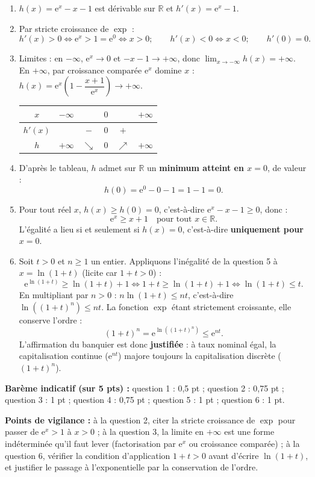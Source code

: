 \documentclass[11pt]{article}
\newcommand{\cle}[1]{{\popxbold\color{popdark}#1}}
\begin{document}
\begin{corrige}
\begin{enumerate}
\item $h(x)=\mathrm{e}^{x}-x-1$ est dérivable sur $\mathbb{R}$ et $h'(x)=\mathrm{e}^{x}-1$.
\item Par stricte croissance de $\exp$ :
\[h'(x)>0\iff \mathrm{e}^{x}>1=\mathrm{e}^{0}\iff x>0 ;\qquad h'(x)<0\iff x<0 ;\qquad h'(0)=0.\]
\item Limites : en $-\infty$, $\mathrm{e}^{x}\to 0$ et $-x-1\to +\infty$, donc $\displaystyle\lim_{x\to -\infty}h(x)=+\infty$.
En $+\infty$, par croissance comparée $\mathrm{e}^{x}$ domine $x$ : $h(x)=\mathrm{e}^{x}\left(1-\dfrac{x+1}{\mathrm{e}^{x}}\right)\to +\infty$.
\begin{center}
\begin{tabular}{|c|ccccc|}
\hline $x$ & $-\infty$ & & $0$ & & $+\infty$ \\ \hline $h'(x)$ & & $-$ & $0$ & $+$ & \\ \hline $h$ & $+\infty$ & $\searrow$ & $0$ & $\nearrow$ & $+\infty$ \\ \hline
\end{tabular}
\end{center}
\item D'après le tableau, $h$ admet sur $\mathbb{R}$ un \textbf{minimum atteint en $x=0$}, de valeur :
\[h(0)=\mathrm{e}^{0}-0-1=1-1=0.\]
\item Pour tout réel $x$, $h(x)\geq h(0)=0$, c'est-à-dire $\mathrm{e}^{x}-x-1\geq 0$, donc :
\[\boxed{\mathrm{e}^{x}\geq x+1\quad\text{pour tout }x\in\mathbb{R}.}\]
L'égalité a lieu si et seulement si $h(x)=0$, c'est-à-dire \textbf{uniquement pour $x=0$}.
\item Soit $t>0$ et $n\geq 1$ un entier. Appliquons l'inégalité de la question 5 à $x=\ln(1+t)$ (licite car $1+t>0$) :
\[\mathrm{e}^{\ln(1+t)}\geq \ln(1+t)+1\iff 1+t\geq \ln(1+t)+1\iff \ln(1+t)\leq t.\]
En multipliant par $n>0$ : $n\ln(1+t)\leq nt$, c'est-à-dire $\ln\!\left((1+t)^{n}\right)\leq nt$.
La fonction $\exp$ étant strictement croissante, elle conserve l'ordre :
\[(1+t)^{n}=\mathrm{e}^{\ln((1+t)^{n})}\leq \mathrm{e}^{nt}.\]
L'affirmation du banquier est donc \textbf{justifiée} : à taux nominal égal, la capitalisation continue ($\mathrm{e}^{nt}$) majore toujours la capitalisation discrète ($(1+t)^{n}$).
\end{enumerate}
\textbf{Barème indicatif (sur 5 pts) :} question 1 : 0,5 pt ; question 2 : 0,75 pt ; question 3 : 1 pt ; question 4 : 0,75 pt ; question 5 : 1 pt ; question 6 : 1 pt.

\textbf{Points de vigilance :} à la question 2, citer la \cle{stricte croissance} de $\exp$ pour passer de $\mathrm{e}^{x}>1$ à $x>0$ ; à la question 3, la limite en $+\infty$ est une forme indéterminée qu'il faut lever (factorisation par $\mathrm{e}^{x}$ ou croissance comparée) ; à la question 6, vérifier la condition d'application $1+t>0$ avant d'écrire $\ln(1+t)$, et justifier le passage à l'exponentielle par la conservation de l'ordre.
\end{corrige}
\end{document}
